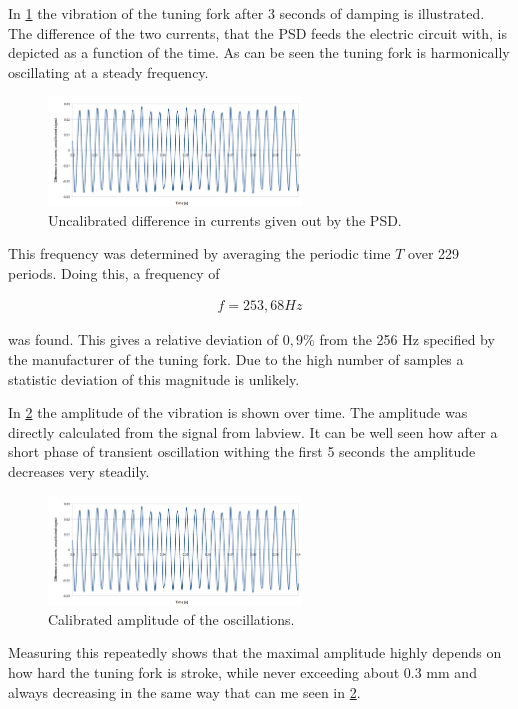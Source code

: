 In \ref{fig:frequency} the vibration of the tuning fork after 3 seconds of damping is illustrated. The difference of the two currents, that the PSD feeds the electric circuit with, is depicted as a function of the time. As can be seen the tuning fork is harmonically oscillating at a steady frequency.

\begin{figure}[H]
	\centering
	\includegraphics[angle=0,width=0.6\textwidth]{img/frequency}
	\caption{Uncalibrated difference in currents given out by the PSD.}
	\label{fig:frequency}
\end{figure}

This frequency was determined by averaging the periodic time $T$ over 229 periods. Doing this, a frequency of 

\begin{eqnarray}
f = 253,68 Hz
\end{eqnarray}

was found. This gives a relative deviation of $0,9\%$ from the 256 Hz specified by the manufacturer of the tuning fork. Due to the high number of samples a statistic deviation of this magnitude is unlikely.

In \ref{fig:amplitude} the amplitude of the vibration is shown over time. The amplitude was directly calculated from the signal from labview. It can be well seen how after a short phase of transient oscillation withing the first 5 seconds the amplitude decreases very steadily.

\begin{figure}[H]
	\centering
	\includegraphics[angle=0,width=0.6\textwidth]{img/frequency}
	\caption{Calibrated amplitude of the oscillations.}
	\label{fig:amplitude}
\end{figure}

Measuring this repeatedly shows that the maximal amplitude highly depends on how hard the tuning fork is stroke, while never exceeding about 0.3 mm and always decreasing in the same way that can me seen in \ref{fig:amplitude}.